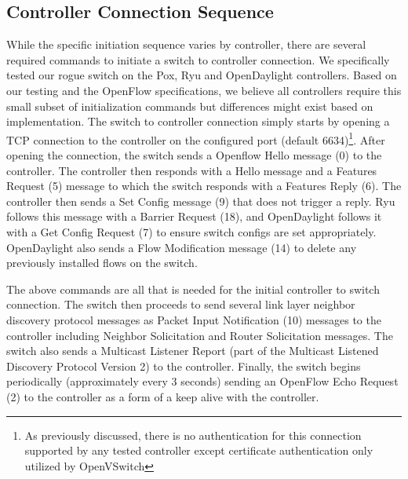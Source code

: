 \subsection {Controller Connection Sequence}
While the specific initiation sequence varies by controller, there are several required commands to initiate a switch to controller connection.  We specifically tested our rogue switch on the Pox, Ryu and OpenDaylight controllers. Based on our testing and the OpenFlow specifications, we believe all controllers require this small subset of initialization commands but differences might exist based on implementation. The switch to controller connection simply starts by opening a TCP connection to the controller on the configured port (default 6634)\footnote{As previously discussed, there is no authentication for this connection supported by any tested controller except certificate authentication only utilized by OpenVSwitch}.  After opening the connection, the switch sends a Openflow Hello message (0) to the controller. The controller then responds with a Hello message and a Features Request (5) message to which the switch responds with a  Features Reply (6). The controller then sends a Set Config message (9) that does not trigger a reply. Ryu follows this message with a Barrier Request (18), and OpenDaylight follows it with a  Get Config Request (7) to ensure switch configs are set appropriately. OpenDaylight also sends a Flow Modification message (14) to delete any previously installed flows on the switch.


The above commands are all that is needed for the initial controller to switch connection. The switch then proceeds to send several link layer neighbor discovery protocol messages as Packet Input Notification (10) messages to the controller including  Neighbor Solicitation and Router Solicitation messages. The switch also sends a Multicast Listener Report (part of the Multicast Listened Discovery Protocol Version 2) to the controller. Finally, the switch begins periodically (approximately every 3 seconds) sending an OpenFlow Echo Request (2) to the controller as a form of a keep alive with the controller.

